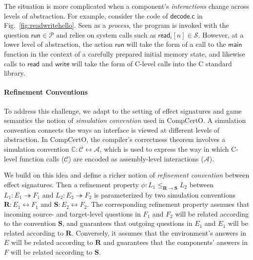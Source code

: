 \documentclass[acmsmall,screen,review,anonymous,nonacm]{acmart}
\newcommand{\kw}[1]{\ensuremath{ \mathsf{#1} }}
\newcommand{\idsc}{\mathbf{id}} %
\newcommand{\vcomp}{\fatsemi}
\begin{document}
The situation is more complicated
when a component's \emph{interactions} change
across levels of abstraction.
For example,
consider the code of $\kw{decode.c}$
in Fig.~\ref{fig:readwritehello}.
Seen as a \emph{process},
the program is invoked with the question
$\kw{run} \in \mathcal{P}$
and relies on system calls such as $\kw{read}_i[n] \in \mathcal{S}$.
However, at a lower level of abstraction,
the action $\kw{run}$
will take the form of a call to the $\kw{main}$ function
in the context of a carefully prepared initial memory state,
and likewise calls to $\kw{read}$ and $\kw{write}$
will take the form of C-level calls into the C standard library.


\paragraph{Refinement Conventions}

To address this challenge,
we adapt to the setting of effect signatures and game semantics
the notion of \emph{simulation convention} used in CompCertO.
A simulation convention connects
the ways an interface is viewed at different levels of abstraction.
In CompCertO,
the compiler's correctness theorem involves
a simulation convention
$\mathbb{C} : \mathcal{C} \leftrightarrow \mathcal{A}$,
which is used to express the way in which
C-level function calls ($\mathcal{C}$) are encoded
as assembly-level interactions ($\mathcal{A}$).

We build on this idea and
define a richer notion of \emph{refinement convention} between effect signatures.
Then a refinement property
$\phi : L_1 \le_{\mathbf{R} \rightarrow \mathbf{S}} L_2$
between
$L_1 : E_1 \twoheadrightarrow F_1$ and 
$L_2 : E_2 \twoheadrightarrow F_2$
is parameterized by two simulation conventions
$\mathbf{R} : E_1 \leftrightarrow F_1$ and
$\mathbf{S} : E_2 \leftrightarrow F_2$.
The corresponding refinement property assumes that incoming
source- and target-level questions in $F_1$ and $F_2$
will be related according to the convention $\mathbf{S}$,
and guarantees that outgoing questions in $E_1$ and $E_1$
will be related according to $\mathbf{R}$.
Conversely, it assumes that
the environment's answers in $E$
will be related according to $\mathbf{R}$
and guarantees that the components' answers in $F$
will be related according to $\mathbf{S}$.

\end{document}
